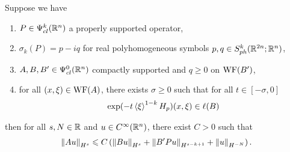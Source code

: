 \documentclass[12pt]{article}
\begin{document}
\begin{ftheorem} 
    Suppose we have 
    \begin{enumerate}
        \item $P \in \Psi^k_{cl}(\R^n)$ a properly supported operator,
        \item $\sigma_{k}(P) = p - iq$ for real polyhomogeneous symbols $p, q \in S^{k}_{ph}(\R^{2n}; \R^{n})$, 
        \item $A, B, B' \in \Psi^{0}_{cl}(\R^n)$ compactly supported and $q \geq 0 $ on $\WF(B')$, 
        \item for all $(x, \xi) \in \WF(A)$, there exists $\sigma \geq 0$ such that for all $t \in [-\sigma, 0]$
        \begin{align*}
            \exp(-t\sym[\xi]^{1-k}H_p)(x, \xi) \in \ell(B)
        \end{align*}
    \end{enumerate}
    then for all $s, N \in \R$ and $u \in C^\infty(\R^n)$, there exist $C > 0$ such that 
    \begin{align*}
        \norm[Au]_{H^s} \leq C\brac{\norm[Bu]_{H^s} + \norm[B'Pu]_{H^{s - k + 1}} + \norm[u]_{H^{-N}}}. 
    \end{align*}
\end{ftheorem}
\end{document}
